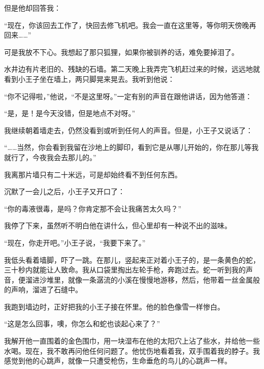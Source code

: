 但是他却回答我：

“现在，你该回去工作了，快回去修飞机吧。我会一直在这里等，等你明天傍晚再回来\ldots{}\ldots{}”

可是我放不下心。我想起了那只狐狸，如果你被驯养的话，难免要掉泪了。

{\startalignment[center]
 \stopalignment}


\stoptitle

\starttitle[title={26}]

水井边有片老旧的、残缺的石墙。第二天晚上我弄完飞机赶过来的时候，远远地就看到小王子坐在墙上，两只脚晃来晃去。我听到他说：

“你不记得啦，”他说，“不是这里呀。”一定有别的声音在跟他讲话，因为他答道：

“是，是！是今天没错，但是地点不对呀。”

我继续朝着墙走去，仍然没看到或听到任何人的声音。但是，小王子又说话了：

“\ldots{}\ldots{}当然，你会看到我留在沙地上的脚印，看到它是从哪儿开始的，你在那儿等我就行了，今夜我会去那儿的。”

我离那片墙只有二十米远，可是却始终看不到任何东西。

沉默了一会儿之后，小王子又开口了：

“你的毒液很毒，是吗？你肯定那不会让我痛苦太久吗？”

我停了下来，虽然听不明白他在讲什么，但心里却有一种说不出的滋味。

{\startalignment[center]
 \stopalignment}

“现在，你走开吧。”小王子说，“我要下来了。”

我低头看着墙脚，吓了一跳。在那儿，竖起来正对着小王子的，是一条黄色的蛇，三十秒内就能让人致命。我从口袋里掏出左轮手枪，奔跑过去。蛇一听到我的声音，便溜进沙堆里，就像一条潺流的小溪在慢慢地游移，然后，他带着一丝金属般的声响，溜进了石缝中。

我跑到墙边时，正好把我的小王子接在怀里。他的脸色像雪一样惨白。

“这是怎么回事，噢，你怎么和蛇也谈起心来了？”

我解开他一直围着的金色围巾，用一块湿布在他的太阳穴上沾了些水，并给他一些水喝。现在，我不敢再问他任何问题了。他忧伤地看着我，双手围着我的脖子。我感觉到他的心跳声，就像一只遭受枪伤，生命垂危的鸟儿的心跳声一样。

